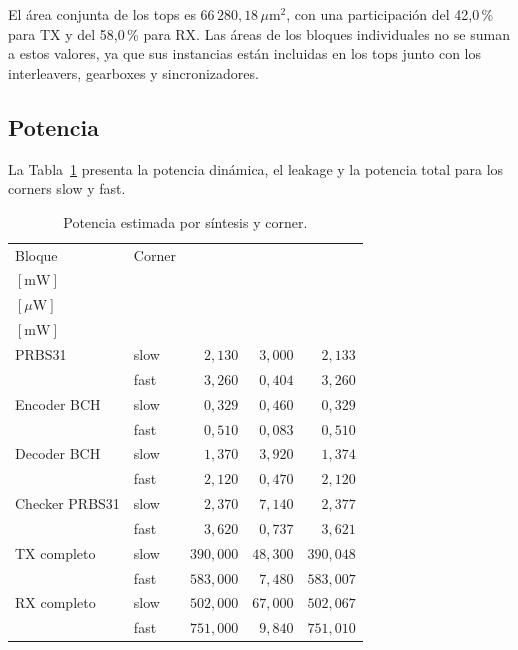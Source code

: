 \documentclass[10pt,a4paper]{article}
\begin{document}
El área conjunta de los tops es $66\,280{,}18\,\mu\mathrm{m}^{2}$,
con una participación del 42{,}0\,\% para TX y del 58{,}0\,\% para RX.
Las áreas de los bloques individuales no se suman a estos valores,
ya que sus instancias están incluidas en los tops junto con los
interleavers, gearboxes y sincronizadores.

\subsection{Potencia}

La Tabla~\ref{tab:sintesis-potencia} presenta la potencia dinámica,
el leakage y la potencia total para los corners slow y fast.

\begin{table}[H]
    \centering
    \small
    \renewcommand{\arraystretch}{1.15}
    \begin{tabular}{@{}llrrr@{}}
        \toprule
        Bloque & Corner &
        \shortstack{$P_{\mathrm{din}}$\\$[\mathrm{mW}]$} &
        \shortstack{$P_{\mathrm{leakage}}$\\$[\mu\mathrm{W}]$} &
        \shortstack{$P_{\mathrm{total}}$\\$[\mathrm{mW}]$} \\
        \midrule
        PRBS31 & slow & $2{,}130$ & $3{,}000$ & $2{,}133$ \\
         & fast & $3{,}260$ & $0{,}404$ & $3{,}260$ \\
        \addlinespace
        Encoder BCH & slow & $0{,}329$ & $0{,}460$ & $0{,}329$ \\
         & fast & $0{,}510$ & $0{,}083$ & $0{,}510$ \\
        \addlinespace
        Decoder BCH & slow & $1{,}370$ & $3{,}920$ & $1{,}374$ \\
         & fast & $2{,}120$ & $0{,}470$ & $2{,}120$ \\
        \addlinespace
        Checker PRBS31 & slow & $2{,}370$ & $7{,}140$ & $2{,}377$ \\
         & fast & $3{,}620$ & $0{,}737$ & $3{,}621$ \\
        \addlinespace
        TX completo & slow & $390{,}000$ & $48{,}300$ & $390{,}048$ \\
         & fast & $583{,}000$ & $7{,}480$ & $583{,}007$ \\
        \addlinespace
        RX completo & slow & $502{,}000$ & $67{,}000$ & $502{,}067$ \\
         & fast & $751{,}000$ & $9{,}840$ & $751{,}010$ \\
        \bottomrule
    \end{tabular}
    \caption{Potencia estimada por síntesis y corner.}
    \label{tab:sintesis-potencia}
\end{table}
\end{document}
